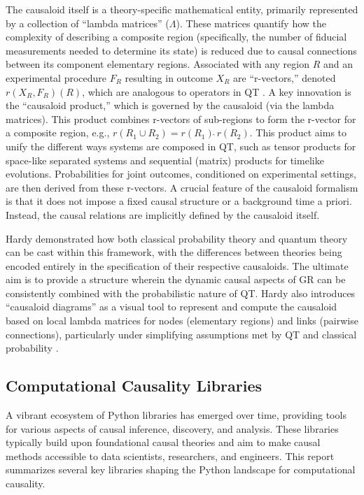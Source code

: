 {The causaloid itself is a theory-specific mathematical entity, primarily represented by a collection of ``lambda matrices'' (\(\Lambda\)). These matrices quantify how the complexity of describing a composite region (specifically, the number of fiducial measurements needed to determine its state) is reduced due to causal connections between its component elementary regions. Associated with any region $R$ and an experimental procedure $F_R$ resulting in outcome $X_R$ are ``r-vectors,'' denoted $r(X_R, F_R)(R)$, which are analogous to operators in QT \cite{hardy2005probability}. A key innovation is the ``causaloid product,'' which is governed by the causaloid (via the lambda matrices). This product combines r-vectors of sub-regions to form the r-vector for a composite region, e.g., $r(R_1 \cup R_2) = r(R_1) \hat{\;} r(R_2)$. This product aims to unify the different ways systems are composed in QT, such as tensor products for space-like separated systems and sequential (matrix) products for timelike evolutions. Probabilities for joint outcomes, conditioned on experimental settings, are then derived from these r-vectors. A crucial feature of the causaloid formalism is that it does not impose a fixed causal structure or a background time a priori. Instead, the causal relations are implicitly defined by the causaloid itself. 

Hardy demonstrated how both classical probability theory and quantum theory can be cast within this framework, with the differences between theories being encoded entirely in the specification of their respective causaloids. The ultimate aim is to provide a structure wherein the dynamic causal aspects of GR can be consistently combined with the probabilistic nature of QT. Hardy also introduces ``causaloid diagrams'' as a visual tool to represent and compute the causaloid based on local lambda matrices for nodes (elementary regions) and links (pairwise connections), particularly under simplifying assumptions met by QT and classical probability \cite{hardy2005probability}.

\newpage

\subsection{Computational Causality Libraries}

A vibrant ecosystem of Python libraries has emerged over time, providing tools for various aspects of causal inference, discovery, and analysis. These libraries typically build upon foundational causal theories and aim to make causal methods accessible to data scientists, researchers, and engineers. This report summarizes several key libraries shaping the Python landscape for computational causality.

}
